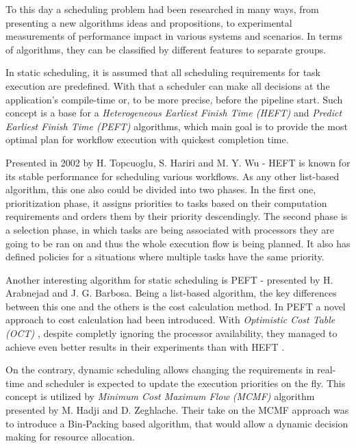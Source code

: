 To this day a scheduling problem had been researched in many ways, from presenting a new algorithms ideas and propositions, to experimental measurements of performance impact in various systems and scenarios.
In terms of algorithms, they can be classified by different features to separate groups.

In static scheduling, it is assumed that all scheduling requirements for task execution are predefined.
With that a scheduler can make all decisions at the application's compile-time or, to be more precise, before the pipeline start.
Such concept is a base for a \textit{Heterogeneous Earliest Finish Time (HEFT)} \cite{HEFT} and \textit{Predict Earliest Finish Time (PEFT)} \cite{PEFT} algorithms, which main goal is to provide the most optimal plan for workflow execution with quickest completion time.

Presented in 2002 by H. Topcuoglu, S. Hariri and M. Y. Wu - HEFT \cite{HEFT} is known for its stable performance for scheduling various workflows. As any other list-based algorithm, this one also could be divided into two phases. In the first one, prioritization phase, it assigns priorities to tasks based on their computation requirements and orders them by their priority descendingly. The second phase is a selection phase, in which tasks are being associated with processors they are going to be ran on and thus the whole execution flow is being planned. It also has defined policies for a situations where multiple tasks have the same priority.

Another interesting algorithm for static scheduling is PEFT \cite{PEFT} - presented by H. Arabnejad and J. G. Barbosa. Being a list-based algorithm, the key differences between this one and the others is the cost calculation method. In PEFT \cite{PEFT} a novel approach to cost calculation had been introduced. With \textit{Optimistic Cost Table (OCT)} \cite{PEFT}, despite completly ignoring the processor availability, they managed to achieve even better results in their experiments than with HEFT \cite{HEFT}.

On the contrary, dynamic scheduling allows changing the requirements in real-time and scheduler is expected to update the execution priorities on the fly.
This concept is utilized by \textit{Minimum Cost Maximum Flow (MCMF)} \cite{MCMF} algorithm presented by M. Hadji and D. Zeghlache.
Their take on the MCMF approach was to introduce a Bin-Packing based algorithm, that would allow a dynamic decision making for resource allocation.